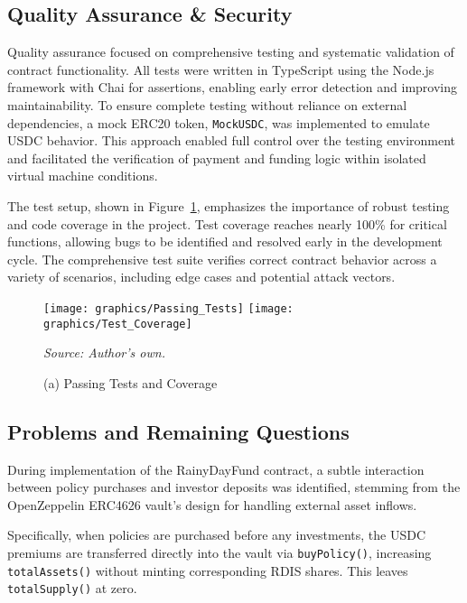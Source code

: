 \documentclass[11pt,a4paper]{article}
\begin{document}
		\subsection{Quality Assurance \& Security}\label{subsec:qa-security}
		Quality assurance focused on comprehensive testing and systematic validation of contract functionality.
		All tests were written in TypeScript using the Node.js framework with Chai for assertions, enabling early error detection and improving maintainability.
		To ensure complete testing without reliance on external dependencies, a mock ERC20 token, \texttt{MockUSDC}, was implemented to emulate USDC behavior.
		This approach enabled full control over the testing environment and facilitated the verification of payment and funding logic within isolated virtual machine conditions.

		The test setup, shown in Figure~\ref{fig:test-set-up}, emphasizes the importance of robust testing and code coverage in the project.
		Test coverage reaches nearly 100\% for critical functions, allowing bugs to be identified and resolved early in the development cycle.
		The comprehensive test suite verifies correct contract behavior across a variety of scenarios, including edge cases and potential attack vectors.

		\begin{figure}[!htbp]
			\centering
			\begin{minipage}[b]{0.48\textwidth}
				\centering
				\texttt{[image: graphics/Passing\_Tests]}
				\texttt{[image: graphics/Test\_Coverage]}
				\caption*{(a) Passing Tests and Coverage} \textit{Source: Author's own.}
			\end{minipage}
			\label{fig:test-set-up}
		\end{figure}

    \FloatBarrier

    \subsection{Problems and Remaining Questions}\label{subsec:problems-and-remaining-questions}

        During implementation of the RainyDayFund contract, a subtle interaction between policy purchases and investor deposits was identified, stemming from the OpenZeppelin ERC4626 vault's design for handling external asset inflows.

        Specifically, when policies are purchased before any investments, the USDC premiums are transferred directly into the vault via \texttt{buyPolicy()}, increasing \texttt{totalAssets()} without minting corresponding RDIS shares.
        This leaves \texttt{totalSupply()} at zero.
\end{document}

